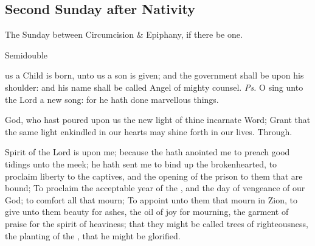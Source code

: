 \subsection{Second Sunday after Nativity}
\fancyhead[RE,LO]{}
\begin{inhead}
{The Sunday between Circumcision \& Epiphany, if there be one.}\par
{Semidouble}
\end{inhead}


\introit
{} us a Child is born, unto us a son is given; and the government shall be upon his shoulder: and his name shall be called Angel of mighty counsel. \textit{Ps.} O sing unto the Lord a new song: for he hath done marvellous things.

\collect
{} God, who hast poured upon us the new light of thine incarnate Word; Grant that the same light enkindled in our hearts may shine forth in our lives. Through.

 Spirit of the Lord  is upon me; because the  hath anointed me to preach good tidings unto the meek; he hath sent me to bind up the brokenhearted, to proclaim liberty to the captives, and the opening of the prison to them that are bound; To proclaim the acceptable year of the , and the day of vengeance of our God; to comfort all that mourn; To appoint unto them that mourn in Zion, to give unto them beauty for ashes, the oil of joy for mourning, the garment of praise for the spirit of heaviness; that they might be called trees of righteousness, the planting of the , that he might be glorified.


